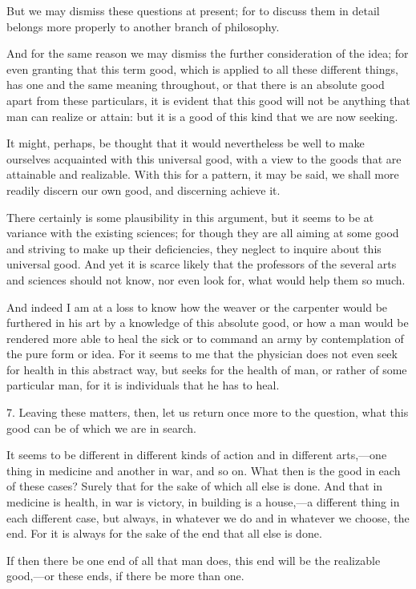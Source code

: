 But we may dismiss these questions at present; for to discuss them in
detail belongs more properly to another branch of philosophy.

And for the same reason we may dismiss the  further
consideration of the idea; for even granting that this term good,
which is applied to all these different things, has one and the same
meaning throughout, or that there is an absolute good apart from
these particulars, it is evident that this good will not be anything
that man can realize or attain: but it is a good of this kind that we
are now seeking.

It might, perhaps, be thought that it would nevertheless be well to
make ourselves acquainted with this universal good, with a view to the
goods that are attainable and realizable. With this for a pattern, it
may be said, we shall more readily discern our own good, and
discerning achieve it.

There certainly is some plausibility in this argument, but it seems to
be at variance with the existing sciences; for though they are all
aiming at some good and striving to make up their deficiencies, they
neglect to inquire about this universal good. And yet it is scarce
likely that the professors of the several arts and sciences should not
know, nor even look for, what would help them so much.

And indeed I am at a loss to know how the weaver or the carpenter
would be furthered in his art by a knowledge of this absolute good, or
how a man would be rendered more able to heal the sick or to command
an army by contemplation of the pure form or idea. For it seems to me
that the physician does not even seek for health in this abstract way,
but seeks for the health of man, or rather of some particular man, for
it is individuals that he has to heal.

7. Leaving these matters, then, let us return once  more to
the question, what this good can be of which we are in search.

It seems to be different in different kinds of action and in different
arts,---one thing in medicine and another in war, and so on. What then
is the good in each of these cases? Surely that for the sake of which
all else is done. And that in medicine is health, in war is victory,
in building is a house,---a different thing in each different case,
but always, in whatever we do and in whatever we choose, the end. For
it is always for the sake of the end that all else is done.

If then there be one end of all that man does, this end will be the
realizable good,---or these ends, if there be more than one.

